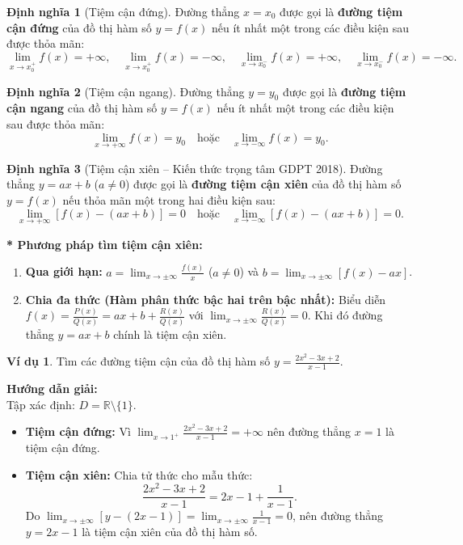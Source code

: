 \documentclass[12pt,a4paper]{article}
\theoremstyle{definition}
\newtheorem{dn}{Định nghĩa}[section]
\newtheorem{vd}{Ví dụ}[section]
\begin{document}
\begin{dn}[Tiệm cận đứng]
Đường thẳng $x = x_0$ được gọi là \textbf{đường tiệm cận đứng} của đồ thị hàm số $y = f(x)$ nếu ít nhất một trong các điều kiện sau được thỏa mãn:
\[
\lim_{x \to x_0^+} f(x) = +\infty, \quad \lim_{x \to x_0^+} f(x) = -\infty, \quad \lim_{x \to x_0^-} f(x) = +\infty, \quad \lim_{x \to x_0^-} f(x) = -\infty.
\]
\end{dn}

\begin{dn}[Tiệm cận ngang]
Đường thẳng $y = y_0$ được gọi là \textbf{đường tiệm cận ngang} của đồ thị hàm số $y = f(x)$ nếu ít nhất một trong các điều kiện sau được thỏa mãn:
\[
\lim_{x \to +\infty} f(x) = y_0 \quad \text{hoặc} \quad \lim_{x \to -\infty} f(x) = y_0.
\]
\end{dn}

\begin{dn}[Tiệm cận xiên -- Kiến thức trọng tâm GDPT 2018]
Đường thẳng $y = ax + b$ ($a \ne 0$) được gọi là \textbf{đường tiệm cận xiên} của đồ thị hàm số $y = f(x)$ nếu thỏa mãn một trong hai điều kiện sau:
\[
\lim_{x \to +\infty} [f(x) - (ax + b)] = 0 \quad \text{hoặc} \quad \lim_{x \to -\infty} [f(x) - (ax + b)] = 0.
\]
\end{dn}

\noindent \textbf{* Phương pháp tìm tiệm cận xiên:}
\begin{enumerate}
    \item \textbf{Qua giới hạn:} $a = \lim_{x \to \pm\infty} \frac{f(x)}{x}$ ($a \ne 0$) và $b = \lim_{x \to \pm\infty} [f(x) - ax]$.
    \item \textbf{Chia đa thức (Hàm phân thức bậc hai trên bậc nhất):} Biểu diễn $f(x) = \frac{P(x)}{Q(x)} = ax + b + \frac{R(x)}{Q(x)}$ với $\lim_{x \to \pm\infty} \frac{R(x)}{Q(x)} = 0$. Khi đó đường thẳng $y = ax + b$ chính là tiệm cận xiên.
\end{enumerate}

\begin{vd}
Tìm các đường tiệm cận của đồ thị hàm số $y = \frac{2x^2 - 3x + 2}{x - 1}$.
\end{vd}
\noindent \textbf{Hướng dẫn giải:} \\
Tập xác định: $D = \mathbb{R} \setminus \{1\}$.
\begin{itemize}
    \item \textbf{Tiệm cận đứng:} Vì $\lim_{x \to 1^+} \frac{2x^2 - 3x + 2}{x - 1} = +\infty$ nên đường thẳng $x = 1$ là tiệm cận đứng.
    \item \textbf{Tiệm cận xiên:} Chia tử thức cho mẫu thức:
    \[
    \frac{2x^2 - 3x + 2}{x - 1} = 2x - 1 + \frac{1}{x - 1}.
    \]
    Do $\lim_{x \to \pm\infty} \left[ y - (2x - 1) \right] = \lim_{x \to \pm\infty} \frac{1}{x - 1} = 0$, nên đường thẳng $y = 2x - 1$ là tiệm cận xiên của đồ thị hàm số.
\end{itemize}
\end{document}
